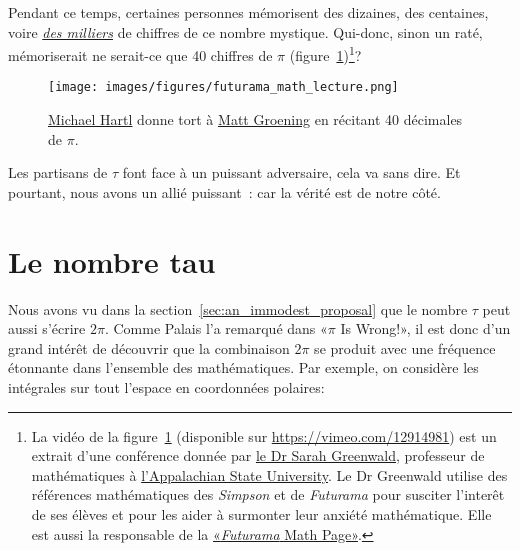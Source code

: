 Pendant ce temps, certaines personnes mémorisent des dizaines, des centaines,
voire
\href{https://www.guinnessworldrecords.com/world-records/most-pi-places-memorised}{\emph{des
milliers}} de chiffres de ce nombre mystique. Qui-donc, sinon un raté, mémoriserait ne serait-ce
que 40 chiffres de $\pi$ (figure~\ref{fig:futurama_video})\ns\footnote{La vidéo de la
figure~\ref{fig:futurama_video} (disponible sur
\url{https://vimeo.com/12914981}) est un extrait d'une conférence donnée par
\href{https://cs.appstate.edu/~sjg/}{le Dr Sarah Greenwald}, professeur de
mathématiques à \href{https://www.appstate.edu/}{l'Appalachian State
University}. Le Dr Greenwald utilise des références mathématiques des
\emph{Simpson} et de \emph{Futurama} pour susciter l'interêt de ses élèves et
pour les aider à surmonter leur anxiété mathématique. Elle est aussi la
responsable de la \href{https://cs.appstate.edu/~sjg/futurama/}{«\ns \emph{Futurama}
Math Page\ns »}.}\ns?

\begin{figure}
\begin{center}
\texttt{[image: images/figures/futurama\_math\_lecture.png]} %
\end{center}
\caption{\href{https://tauday.com/tau-manifesto/\#sec-about_the_author}{Michael
Hartl} donne tort à \href{https://fr.wikipedia.org/wiki/Matt_Groening}{Matt
Groening} en récitant 40 décimales de $\pi$.\label{fig:futurama_video}}
\end{figure}

Les partisans de $\tau$ font face à un puissant adversaire, cela va sans dire. Et
pourtant, nous avons un allié puissant~: car la vérité est de notre côté.


\section{Le nombre tau} %
\label{sec:the_number_tau}

Nous avons vu dans la section~\ref{sec:an_immodest_proposal} que le nombre $\tau$ peut aussi s'écrire
$2\pi$. Comme Palais l'a remarqué dans «\ns $\pi$ Is Wrong!\ns », il est donc d'un grand
intérêt de découvrir que la combinaison $2\pi$ se produit avec une fréquence
étonnante dans l'ensemble des mathématiques. Par exemple, on considère les
intégrales sur tout l'espace en coordonnées polaires:

